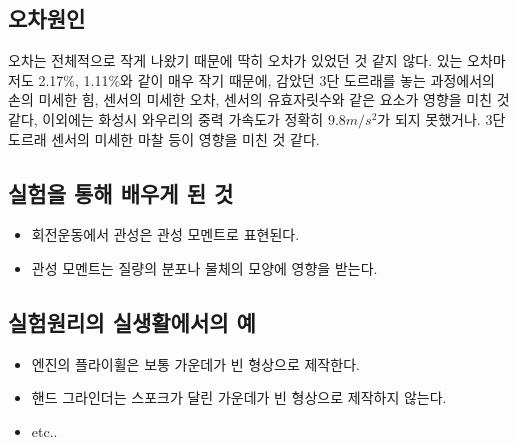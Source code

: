 \documentclass[12pt,a4paper]{article}
\begin{document}
\subsection{오차원인}
오차는 전체적으로 작게 나왔기 때문에 딱히 오차가 있었던 것 같지 않다.
있는 오차마저도 2.17\%, 1.11\%와 같이 매우 작기 때문에, 감았던 3단 도르래를 놓는
과정에서의 손의 미세한 힘, 센서의 미세한 오차, 센서의 유효자릿수와 같은 요소가 영향을
미친 것 같다, 이외에는 화성시 와우리의 중력 가속도가 정확히 $9.8m/s^2$가 되지
못했거나. 3단 도르래 센서의 미세한 마찰 등이 영향을 미친 것 같다.
\subsection{실험을 통해 배우게 된 것}
\begin{itemize}
    \item 회전운동에서 관성은 관성 모멘트로 표현된다.
    \item 관성 모멘트는 질량의 분포나 물체의 모양에 영향을 받는다.
\end{itemize}
\subsection{실험원리의 실생활에서의 예}
\begin{itemize}
    \item 엔진의 플라이휠은 보통 가운데가 빈 형상으로 제작한다.
    \item 핸드 그라인더는 스포크가 달린 가운데가 빈 형상으로 제작하지 않는다.
    \item etc..
\end{itemize}
\end{document}
